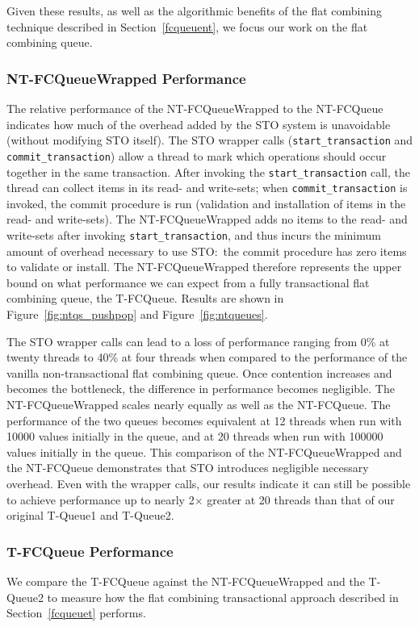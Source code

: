 Given these results, as well as the algorithmic benefits of the flat combining technique described in Section~\ref{fcqueuent}, we focus our work on the flat combining queue.

\subsubsection{NT-FCQueueWrapped Performance}
The relative performance of the NT-FCQueueWrapped to the NT-FCQueue indicates how much of the overhead added by the STO system is unavoidable (without modifying STO itself). The STO wrapper calls (\texttt{start\_transaction} and \texttt{commit\_transaction}) allow a thread to mark which operations should occur together in the same transaction. After invoking the \texttt{start\_transaction} call, the thread can collect items in its read- and write-sets; when \texttt{commit\_transaction} is invoked, the commit procedure is run (validation and installation of items in the read- and write-sets). The NT-FCQueueWrapped adds no items to the read- and write-sets after invoking \texttt{start\_transaction}, and thus incurs the minimum amount of overhead necessary to use STO:\ the commit procedure has zero items to validate or install. The NT-FCQueueWrapped therefore represents the upper bound on what performance we can expect from a fully transactional flat combining queue, the T-FCQueue. 
Results are shown in Figure~\ref{fig:ntqs_pushpop} and Figure~\ref{fig:ntqueues}. 

The STO wrapper calls can lead to a loss of performance ranging from 0\% at twenty threads to 40\% at four threads when compared to the performance of the vanilla non-transactional flat combining queue. Once contention increases and becomes the bottleneck, the difference in performance becomes negligible. The NT-FCQueueWrapped scales nearly equally as well as the NT-FCQueue. The performance of the two queues becomes equivalent at 12 threads when run with 10000 values initially in the queue, and at 20 threads when run with 100000 values initially in the queue. This comparison of the NT-FCQueueWrapped and the NT-FCQueue demonstrates that STO introduces negligible necessary overhead. Even with the wrapper calls, our results indicate it can still be possible to achieve performance up to nearly 2$\times$ greater at 20 threads than that of our original T-Queue1 and T-Queue2.

\subsubsection{T-FCQueue Performance}
We compare the T-FCQueue against the NT-FCQueueWrapped and the T-Queue2 to measure how the flat combining transactional approach described in Section~\ref{fcqueuet} performs.

